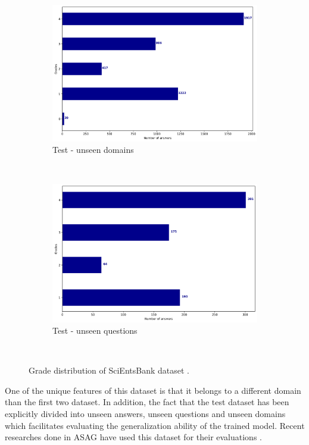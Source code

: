 \begin{figure}
		~
		\begin{subfigure}[b]{0.4\textwidth}
			\includegraphics[width=\textwidth]{images/semevalt2grades}
			\caption{Test - unseen domains}
		\end{subfigure}
		~ 
		\begin{subfigure}[b]{0.4\textwidth}
			\includegraphics[width=\textwidth]{images/semevalt3grades}
			\caption{Test - unseen questions}
		\end{subfigure}
		~ 
		\caption{Grade distribution of SciEntsBank dataset \cite{dzikovska2013}.}\label{semevalgrades}
	\end{figure}
	
	One of the unique features of this dataset is that it belongs to a different domain than the first two dataset. In addition, the fact that the test dataset has been explicitly divided into unseen answers, unseen questions and unseen domains which facilitates evaluating the generalization ability of the trained model. Recent researches done in ASAG have used this dataset for their evaluations \cite{liu2016validation} \cite{kumar2017earth}. 
    
